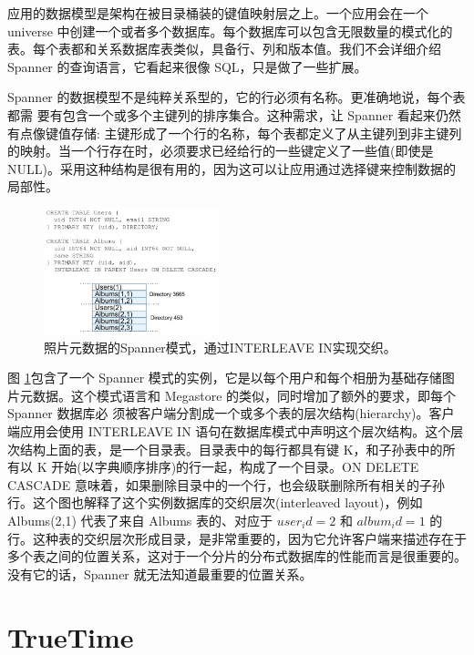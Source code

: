 \documentclass[letterpaper,twocolumn,10pt]{article}
\begin{document}
应用的数据模型是架构在被目录桶装的键值映射层之上。一个应用会在一个 universe 中创建一个或者多个数据库。每个数据库可以包含无限数量的模式化的表。每个表都和关系数据库表类似，具备行、列和版本值。我们不会详细介绍 Spanner 的查询语言，它看起来很像 SQL，只是做了一些扩展。

Spanner 的数据模型不是纯粹关系型的，它的行必须有名称。更准确地说，每个表都需 要有包含一个或多个主键列的排序集合。这种需求，让 Spanner 看起来仍然有点像键值存储: 主键形成了一个行的名称，每个表都定义了从主键列到非主键列的映射。当一个行存在时，必须要求已经给行的一些键定义了一些值(即使是 NULL)。采用这种结构是很有用的，因为这可以让应用通过选择键来控制数据的局部性。

\begin{figure}[htbp]
\begin{center}
\includegraphics[width=0.45\textwidth]{./fig_4.png}
\caption{照片元数据的Spanner模式，通过INTERLEAVE IN实现交织。}
\label{Fig4}
\end{center}
\end{figure}

图 \ref{Fig4}包含了一个 Spanner 模式的实例，它是以每个用户和每个相册为基础存储图片元数据。这个模式语言和 Megastore 的类似，同时增加了额外的要求，即每个 Spanner 数据库必 须被客户端分割成一个或多个表的层次结构(hierarchy)。客户端应用会使用 INTERLEAVE IN 语句在数据库模式中声明这个层次结构。这个层次结构上面的表，是一个目录表。目录表中的每行都具有键 K，和子孙表中的所有以 K 开始(以字典顺序排序)的行一起，构成了一个目录。ON DELETE CASCADE 意味着，如果删除目录中的一个行，也会级联删除所有相关的子孙行。这个图也解释了这个实例数据库的交织层次(interleaved layout)，例如 Albums(2,1) 代表了来自 Albums 表的、对应于 $user_id=2$ 和 $album_id=1$ 的行。这种表的交织层次形成目录，是非常重要的，因为它允许客户端来描述存在于多个表之间的位置关系，这对于一个分片的分布式数据库的性能而言是很重要的。没有它的话，Spanner 就无法知道最重要的位置关系。

\section{TrueTime}
\end{document}
